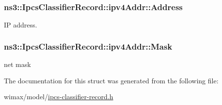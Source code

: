\subsubsection[{\texorpdfstring{Address}{Address}}]{ ns3\+::\+Ipcs\+Classifier\+Record\+::ipv4\+Addr\+::\+Address}\hypertarget{structns3_1_1IpcsClassifierRecord_1_1ipv4Addr_ac168bf6b3ab316103762f57a17b20936}{}\label{structns3_1_1IpcsClassifierRecord_1_1ipv4Addr_ac168bf6b3ab316103762f57a17b20936}


IP address. 

\subsubsection[{\texorpdfstring{Mask}{Mask}}]{ ns3\+::\+Ipcs\+Classifier\+Record\+::ipv4\+Addr\+::\+Mask}\hypertarget{structns3_1_1IpcsClassifierRecord_1_1ipv4Addr_a684496a8e016d090a337acbf4ceea959}{}\label{structns3_1_1IpcsClassifierRecord_1_1ipv4Addr_a684496a8e016d090a337acbf4ceea959}


net mask 



The documentation for this struct was generated from the following file\+:\begin{DoxyCompactItemize}
\item 
wimax/model/\hyperlink{ipcs-classifier-record_8h}{ipcs-\/classifier-\/record.\+h}\end{DoxyCompactItemize}
